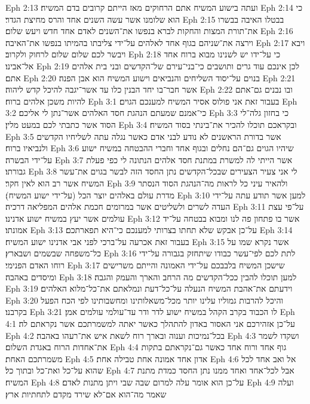 Eph 2:13  ועתה בישוע המשיח אתם הרחוקים מאז הייתם קרובים בדם המשיח׃
Eph 2:14  כי הוא שלומנו אשר עשה השנים אחד והרס מחיצת הגדר׃
Eph 2:15  בבטלו האיבה בבשרו את־תורת המצות והחקות לברא בנפשו את־השנים לאדם אחד חדש ויעש שלום׃
Eph 2:16  וירצה את־שניהם בגוף אחד לאלהים על־ידי צליבתו בהמיתו בנפשו את־האיבה׃
Eph 2:17  ויבא ויבשר לכם שלום שלום לרחוק ולקרוב׃
Eph 2:18  כי על־ידו יש לשנינו מבוא ברוח אחד אל־אבינו׃
Eph 2:19  לכן אינכם עוד גרים ותושבים כי־בני־עירם של־הקדשים ובני בית אלהים אתם׃
Eph 2:20  בנוים על־יסוד השליחים והנביאים וישוע המשיח הוא אבן הפנה׃
Eph 2:21  אשר חבר־בו יחד הבנין כלו עד אשר־יגבה להיכל קדש ליהוה׃
Eph 2:22  ובו נבנים גם־אתם להיות משכן אלהים ברוח׃
Eph 3:1  בעבור זאת אני פולוס אסיר המשיח למענכם הגוים׃
Eph 3:2  כי־אמנם שמעתם הנהגת חסד האלהים אשר־נתן לי אליכם׃
Eph 3:3  כי בחזון גלה־לי הסוד אשר כתבתי לכם במעט מלין׃
Eph 3:4  ובקראכם תוכלו להכיר את־בינתי בסוד המשיח׃
Eph 3:5  אשר בדורת הראשנים לא נודע לבני אדם כאשר נגלה עתה לשליחיו הקדשים ולנביאיו ברוח׃
Eph 3:6  שיהיו הגוים גם־הם נחלים ובגוף אחד וחברי ההבטחה במשיח ישוע על־ידי הבשרה׃
Eph 3:7  אשר הייתי לה למשרת במתנת חסד אלהים הנתונה לי כפי פעלת גבורתו׃
Eph 3:8  לי אני צעיר הצעירים שבכל־הקדשים נתן החסד הזה לבשר בגוים את־עשר המשיח אשר רב הוא לאין חקר׃
Eph 3:9  ולהאיר עיני כל לראות מה־הנהגת הסוד הנסתר מדרת עולם באלהים יוצר הכל (על־ידי ישוע המשיח)׃
Eph 3:10  למען אשר תודע עתה על־ידי העדה לשרים ולשליטים אשר במרומים חכמת אלהים המפליאה דרכיה׃
Eph 3:11  על־פי עצת עולמים אשר יעץ במשיח ישוע אדנינו׃
Eph 3:12  אשר בו פתחון פה לנו ומבוא בבטחה על־יד אמונתו׃
Eph 3:13  על־כן אבקש שלא תחתו בצרותי למענכם כי־היא תפארתכם׃
Eph 3:14  בעבור זאת אכרעה על־ברכי לפני אבי אדנינו ישוע המשיח׃
Eph 3:15  אשר נקרא שמו על כל־משפחה שבשמים ושבארץ׃
Eph 3:16  לתת לכם לפי־עשר כבודו שיתחזק בגבורה על־ידי רוחו האדם הפנימי׃
Eph 3:17  שישכן המשיח בלבבכם על־ידי האמונה והייתם משרישים ומיסדים באהבה׃
Eph 3:18  למען תוכלו להבין ככל־הקדשים מה הרחב והארך והעמק והגבה׃
Eph 3:19  וידעתם את־אהבת המשיח הנעלה על־כל־דעת ונמלאתם את־כל־מלוא האלהים׃
Eph 3:20  והיכל להרבות גמוליו עלינו יותר מכל־משאלותינו ומחשבותינו לפי הכח הפעל בקרבנו׃
Eph 3:21  לו הכבוד בקרב הקהל במשיח ישוע לדר ודר עד־עולמי עולמים אמן׃
Eph 4:1  על־כן אזהירכם אני האסור באדון להתהלך כאשר יאתה למשמרתכם אשר נקראתם לה׃
Eph 4:2  בכל־נמיכות וענוה ובארך רוח לשאת איש את־רעהו באהבה׃
Eph 4:3  ושקדו לשמר את־אחדות הרוח באגדת השלום׃
Eph 4:4  גוף אחד ורוח אחד כאשר גם־נקראתם בתקות משמרתכם האחת׃
Eph 4:5  אדון אחד אמונה אחת טבילה אחת׃
Eph 4:6  אל ואב אחד לכל שהוא על־כל ואת־כל ובתוך כל׃
Eph 4:7  אבל לכל־אחד ואחד ממנו נתן החסד כמדת מתנת המשיח׃
Eph 4:8  על־כן הוא אומר עלה למרום שבה שבי ויתן מתנות לאדם׃
Eph 4:9  ועלה שאמר מה־הוא אם־לא שירד מקדם לתחתיות ארץ׃
